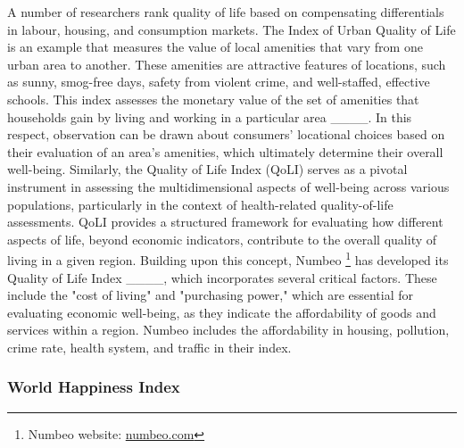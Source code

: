 A number of researchers rank quality of life based on compensating differentials in labour, housing, and consumption markets. The Index of Urban Quality of Life is an example that measures the value of local amenities that vary from one urban area to another. These amenities are attractive features of locations, such as sunny, smog-free days, safety from violent crime, and well-staffed, effective schools. This index assesses the monetary value of the set of amenities that households gain by living and working in a particular area ____. In this respect, observation can be drawn about consumers' locational choices based on their evaluation of an area's amenities, which ultimately determine their overall well-being. Similarly, the Quality of Life Index (QoLI) %
serves as a pivotal instrument in assessing the multidimensional aspects of well-being across various populations, particularly in the context of health-related quality-of-life assessments. QoLI provides a structured framework for evaluating how different aspects of life, beyond economic indicators, contribute to the overall quality of living in a given region. Building upon this concept, Numbeo \footnote{Numbeo website: \url{numbeo.com}} has developed its Quality of Life Index ____, which incorporates several critical factors. These include the "cost of living" and "purchasing power," which are essential for evaluating economic well-being, as they indicate the affordability of goods and services within a region. Numbeo includes the affordability in housing, pollution, crime rate, health system, and traffic in their index. 
 
\subsubsection{World Happiness Index}

